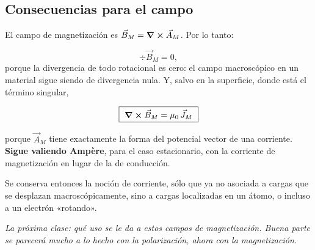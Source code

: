 \documentclass[12pt,a4paper]{article}
\begin{document}
\subsection{Consecuencias para el campo}

El campo de magnetización es $\vec B_M = \curl \vec A_M$. Por lo tanto:

\[
\div \vec B_M = 0,
\]
porque la divergencia de todo rotacional es cero: el campo macroscópico en un
material sigue siendo de divergencia nula. Y, salvo en la superficie, donde
está el término singular,

\begin{keybox}
\[
\boxed{\ \curl \vec B_M = \mu_0\,\vec J_M\ }
\]
\end{keybox}
porque $\vec A_M$ tiene exactamente la forma del potencial vector de una
corriente. \textbf{Sigue valiendo Ampère}, para el caso estacionario, con la
corriente de magnetización en lugar de la de conducción.

Se conserva entonces la noción de corriente, sólo que ya no asociada a cargas
que se desplazan macroscópicamente, sino a cargas localizadas en un átomo, o
incluso a un electrón «rotando».

\noindent\emph{La próxima clase: qué uso se le da a estos campos de magnetización. Buena
parte se parecerá mucho a lo hecho con la polarización, ahora con la
magnetización.}
\end{document}
